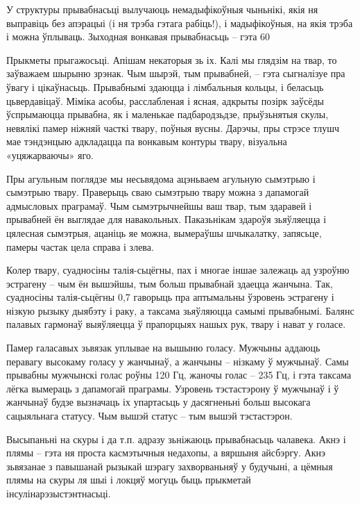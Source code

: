У структуры прывабнасьці вылучаюць немадыфікоўныя чыньнікі, якія ня выправіць без апэрацыі (і ня трэба гэтага рабіць!), і мадыфікоўныя, на якія трэба і можна ўплываць. Зыходная вонкавая прывабнасьць – гэта 60%

Прыкметы прыгажосьці. Апішам некаторыя зь іх. Калі мы глядзім на твар, то заўважаем шырыню зрэнак. Чым шырэй, тым прывабней, – гэта сыгналізуе пра ўвагу і цікаўнасьць. Прывабнымі здаюцца і лімбальныя кольцы, і беласьць цьвердавіцаў. Міміка асобы, расслабленая і ясная, адкрыты позірк заўсёды ўспрымаюцца прывабна, як і маленькае падбародзьдзе, прыўзьнятыя скулы, невялікі памер ніжняй часткі твару, поўныя вусны. Дарэчы, пры стрэсе тлушч мае тэндэнцыю адкладацца па вонкавым контуры твару, візуальна «уцяжарваючы» яго.

Пры агульным поглядзе мы несьвядома ацэньваем агульную сымэтрыю і сымэтрыю твару. Праверыць сваю сымэтрыю твару можна з дапамогай адмысловых праграмаў. Чым сымэтрычнейшы ваш твар, тым здаравей і прывабней ён выглядае для навакольных. Паказьнікам здароўя зьяўляецца і цялесная сымэтрыя, ацаніць яе можна, вымераўшы шчыкалатку, запясьце, памеры частак цела справа і злева.

Колер твару, суадносіны талія-сьцёгны, пах і многае іншае залежаць ад узроўню эстрагену – чым ён вышэйшы, тым больш прывабнай здаецца жанчына. Так, суадносіны талія-сьцёгны 0,7 гаворыць пра аптымальны ўзровень эстрагену і нізкую рызыку дыябэту і раку, а таксама зьяўляюцца самымі прывабнымі. Балянс палавых гармонаў выяўляецца ў прапорцыях нашых рук, твару і нават у голасе.

Памер галасавых зьвязак уплывае на вышыню голасу. Мужчыны аддаюць перавагу высокаму голасу у жанчынаў, а жанчыны – нізкаму ў мужчынаў. Самы прывабны мужчынскі голас роўны 120 Гц, жаночы голас – 235 Гц, і гэта таксама лёгка вымераць з дапамогай праграмы. Узровень тэстастэрону ў мужчынаў і ў жанчынаў будзе вызначаць іх упартасьць у дасягненьні больш высокага сацыяльнага статусу. Чым вышэй статус – тым вышэй тэстастэрон.

Высыпаньні на скуры і да т.п. адразу зьніжаюць прывабнасьць чалавека. Акнэ і плямы – гэта ня проста касмэтычныя недахопы, а вяршыня айсбэргу. Акнэ зьвязанае з павышанай рызыкай шэрагу захворваньняў у будучыні, а цёмныя плямы на скуры ля шыі і локцяў могуць быць прыкметай інсулінарэзыстэнтнасьці.

